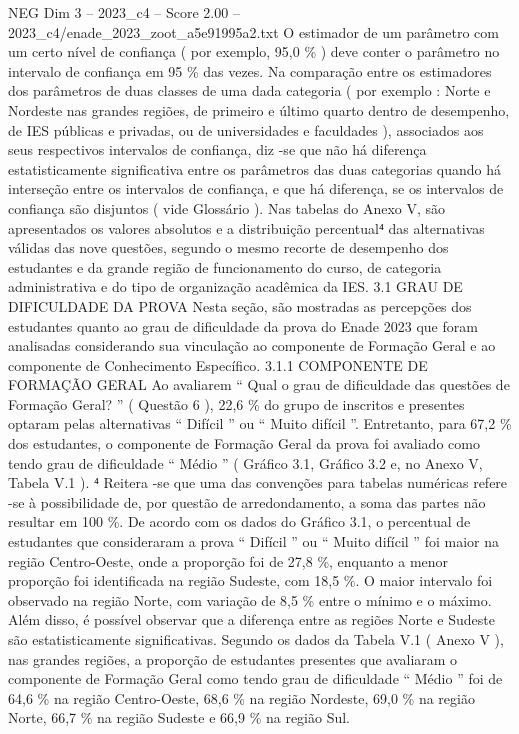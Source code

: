 \begin{textsample}{NEG Dim 3 – 2023\_c4 – Score 2.00 – 2023\_c4/enade\_2023\_zoot\_a5e91995a2.txt}
O estimador de um parâmetro com um certo nível de confiança ( por exemplo, 95,0 \% ) deve conter o parâmetro no intervalo de confiança em 95 \% das vezes.
Na comparação entre os estimadores dos parâmetros de duas classes de uma dada categoria ( por exemplo : Norte e Nordeste nas grandes regiões, de primeiro e último quarto dentro de desempenho, de IES públicas e privadas, ou de universidades e faculdades ), associados aos seus respectivos intervalos de confiança, diz -se que não há diferença estatisticamente significativa entre os parâmetros das duas categorias quando há interseção entre os intervalos de confiança, e que há diferença, se os intervalos de confiança são disjuntos ( vide Glossário ).
Nas tabelas do Anexo V, são apresentados os valores absolutos e a distribuição percentual⁴ das alternativas válidas das nove questões, segundo o mesmo recorte de desempenho dos estudantes e da grande região de funcionamento do curso, de categoria administrativa e do tipo de organização acadêmica da IES. 3.1 GRAU DE DIFICULDADE DA PROVA Nesta seção, são mostradas as percepções dos estudantes quanto ao grau de dificuldade da prova do Enade 2023 que foram analisadas considerando sua vinculação ao componente de Formação Geral e ao componente de Conhecimento Específico. 3.1.1 COMPONENTE DE FORMAÇÃO GERAL Ao avaliarem “ Qual o grau de dificuldade das questões de Formação Geral? ” ( Questão 6 ), 22,6 \% do grupo de inscritos e presentes optaram pelas alternativas “ Difícil ” ou “ Muito difícil ”.
Entretanto, para 67,2 \% dos estudantes, o componente de Formação Geral da prova foi avaliado como tendo grau de dificuldade “ Médio ” ( Gráfico 3.1, Gráfico 3.2 e, no Anexo V, Tabela V.1 ). ⁴ Reitera -se que uma das convenções para tabelas numéricas refere -se à possibilidade de, por questão de arredondamento, a soma das partes não resultar em 100 \%.
De acordo com os dados do Gráfico 3.1, o percentual de estudantes que consideraram a prova “ Difícil ” ou “ Muito difícil ” foi maior na região Centro-Oeste, onde a proporção foi de 27,8 \%, enquanto a menor proporção foi identificada na região Sudeste, com 18,5 \%.
O maior intervalo foi observado na região Norte, com variação de 8,5 \% entre o mínimo e o máximo.
Além disso, é possível observar que a diferença entre as regiões Norte e Sudeste são estatisticamente significativas.
Segundo os dados da Tabela V.1 ( Anexo V ), nas grandes regiões, a proporção de estudantes presentes que avaliaram o componente de Formação Geral como tendo grau de dificuldade “ Médio ” foi de 64,6 \% na região Centro-Oeste, 68,6 \% na região Nordeste, 69,0 \% na região Norte, 66,7 \% na região Sudeste e 66,9 \% na região Sul.

\end{textsample}
